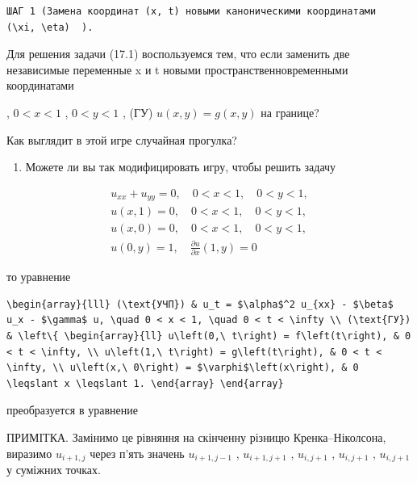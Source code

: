 \documentclass[
  ukrainian,
]{article}
\providecommand{\tightlist}{%
  \setlength{\itemsep}{0pt}\setlength{\parskip}{0pt}}
\begin{document}
\begin{verbatim}
ШАГ 1 (Замена координат (x, t) новыми каноническими координатами   (\xi, \eta)  ).
\end{verbatim}

Для решения задачи (17.1) воспользуемся тем, что если заменить две
независимые переменные x и t новыми пространственновременными
координатами

, \(0 < x < 1\) , \(0 < y < 1\) , (ГУ) \(u(x, y) = g(x, y)\) на границе?

Как выглядит в этой игре случайная прогулка?

\begin{enumerate}
\def\labelenumi{\arabic{enumi}.}
\setcounter{enumi}{3}
\tightlist
\item
  Можете ли вы так модифицировать игру, чтобы решить задачу
\end{enumerate}

\[
\begin{array}{l} u_{xx} + u_{yy} = 0, \quad 0 < x < 1, \quad 0 < y < 1, \\ u(x, 1) = 0, \quad 0 < x < 1, \quad 0 < y < 1, \\ u(x, 0) = 0, \quad 0 < x < 1, \quad 0 < y < 1, \\ u(0, y) = 1, \quad \frac{\partial u}{\partial x}(1, y) = 0 \end{array}
\]

то уравнение

\begin{verbatim}
\begin{array}{lll} (\text{УЧП}) & u_t = $\alpha$^2 u_{xx} - $\beta$ u_x - $\gamma$ u, \quad 0 < x < 1, \quad 0 < t < \infty \\ (\text{ГУ}) & \left\{ \begin{array}{ll} u\left(0,\ t\right) = f\left(t\right), & 0 < t < \infty, \\ u\left(1,\ t\right) = g\left(t\right), & 0 < t < \infty, \\ u\left(x,\ 0\right) = $\varphi$\left(x\right), & 0 \leqslant x \leqslant 1. \end{array} \end{array}
\end{verbatim}

преобразуется в уравнение

ПРИМІТКА. Замінимо це рівняння на скінченну різницю Кренка--Ніколсона,
виразимо \(u_{i+1,j}\) через п'ять значень \(u_{i+1,j-1}\) ,
\(u_{i+1,j+1}\) , \(u_{i,j+1}\) , \(u_{i,j+1}\) , \(u_{i,j+1}\) у
суміжних точках.
\end{document}
